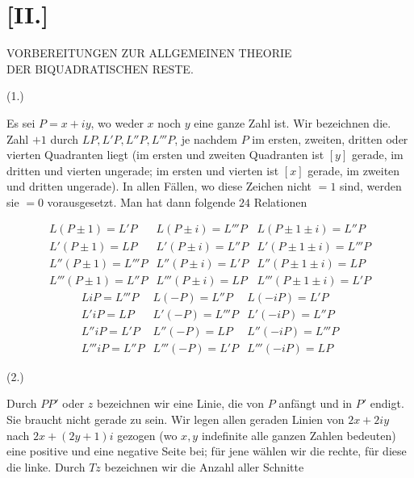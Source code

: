 
\section*{[II.]}
\begin{center}VORBEREITUNGEN ZUR ALLGEMEINEN THEORIE\\DER BIQUADRATISCHEN RESTE.\end{center}
\par\medskip{}\centerline{(1.)}\smallskip
Es sei $P=x+iy$, wo weder $x$ noch $y$ eine ganze Zahl ist. Wir bezeichnen die. Zahl $+1$ durch $LP,L'P,L''P,L'''P$, je nachdem $P$ im ersten, zweiten, dritten oder vierten Quadranten liegt (im ersten und zweiten Quadranten ist $[y]$ gerade, im dritten und vierten ungerade; im ersten und vierten ist $[x]$ gerade, im zweiten und dritten ungerade). In allen Fällen, wo diese Zeichen nicht $=1$ sind, werden sie $=0$ vorausgesetzt. Man hat dann folgende $24$ Relationen

\[
\begin{array}{lll}
L(P\pm1)=L'P&L(P\pm i)=L'''P&L(P\pm1\pm i)=L''P\\
L'(P\pm1)=LP&L'(P\pm i)=L''P&L'(P\pm1\pm i)=L'''P\\
L''(P\pm1)=L'''P&L''(P\pm i)=L'P&L''(P\pm1\pm i)=LP\\
L'''(P\pm1)=L''P&L'''(P\pm i)=LP&L'''(P\pm1\pm i)=L'P
\end{array}
\]
\[
\begin{array}{lll}
LiP=L'''P&L(-P)=L''P&L(-iP)=L'P\\
L'iP=LP&L'(-P)=L'''P&L'(-iP)=L''P\\
L''iP=L'P&L''(-P)=LP&L''(-iP)=L'''P\\
L'''iP=L''P&L'''(-P)=L'P&L'''(-iP)=LP
\end{array}
\]

\par\medskip{}\centerline{(2.)}\smallskip
Durch $PP'$ oder $z$ bezeichnen wir eine Linie, die von $P$ anfängt und in $P'$ endigt. Sie braucht nicht gerade zu sein. Wir legen allen geraden Linien von $2x+2iy$ nach $2x+(2y+1)i$ gezogen (wo $x,y$ indefinite alle ganzen Zahlen bedeuten) eine positive und eine negative Seite bei; für jene wählen wir die rechte, für diese die linke. Durch $Tz$ bezeichnen wir die Anzahl aller Schnitte

